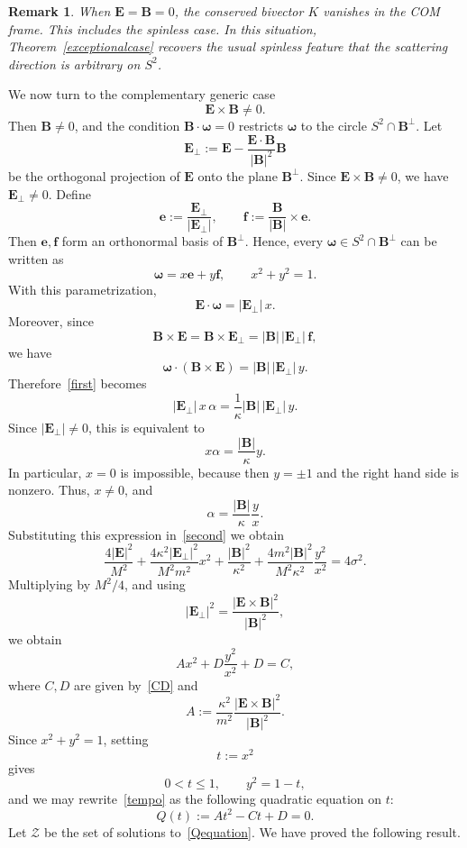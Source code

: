 \documentclass[10pt,a4paper]{amsart}
\newtheorem{remark}[theorem]{Remark}
\begin{document}
\begin{remark}
When ${\bm E}={\bm B}=0$, the conserved bivector $K$ vanishes in the COM frame. This includes the spinless case. In this situation, Theorem~\ref{exceptionalcase} recovers the usual spinless feature that the scattering direction is arbitrary on $S^2$.
\end{remark}
We now turn to the complementary generic case
\[
{\bm E}\times{\bm B}\neq0.
\]
Then ${\bm B}\neq0$, and the condition ${\bm B}\cdot{\bm \omega}=0$ restricts ${\bm \omega}$ to the circle $
S^2\cap{\bm B}^{\perp}$.
Let
\[
{\bm E}_{\perp}:={\bm E}-\frac{{\bm E}\cdot{\bm B}}{|{\bm B}|^2}{\bm B}
\]
be the orthogonal projection of ${\bm E}$ onto the plane ${\bm B}^{\perp}$. Since ${\bm E}\times{\bm B}\neq0$, we have ${\bm E}_{\perp}\neq0$. Define
\begin{equation}\label{basis}
{\bm e}:=\frac{{\bm E}_{\perp}}{|{\bm E}_{\perp}|},\qquad{\bm f}:=\frac{{\bm B}}{|{\bm B}|}\times{\bm e}.
\end{equation}
Then ${\bm e},{\bm f}$ form an orthonormal basis of ${\bm B}^{\perp}$. Hence, every ${\bm \omega}\in S^2\cap{\bm B}^{\perp}$ can be written as
\[
{\bm \omega}=x{\bm e}+y{\bm f},\qquad x^2+y^2=1.
\]
With this parametrization,
\[
{\bm E}\cdot{\bm \omega}=|{\bm E}_{\perp}|\,x.
\]
Moreover, since
\[
{\bm B}\times{\bm E}={\bm B}\times{\bm E}_{\perp}=|{\bm B}|\,|{\bm E}_{\perp}|\,{\bm f},
\]
we have
\[
{\bm \omega}\cdot({\bm B}\times{\bm E})=|{\bm B}|\,|{\bm E}_{\perp}|\,y.
\]
Therefore~\eqref{first} becomes
\[
|{\bm E}_{\perp}|\,x\,\alpha=\frac1\kappa|{\bm B}|\,|{\bm E}_{\perp}|\,y.
\]
Since $|{\bm E}_{\perp}|\neq0$, this is equivalent to
\[
x\alpha=\frac{|{\bm B}|}{\kappa}y.
\]
In particular, $x=0$ is impossible, because then $y=\pm1$ and the right hand side is nonzero. Thus, $x\neq0$, and
\[
\alpha=\frac{|{\bm B}|}{\kappa}\frac{y}{x}.
\]
Substituting this expression in~\eqref{second} we obtain
\[
\frac{4|{\bm E}|^2}{M^2}+\frac{4\kappa^2 |{\bm E}_{\perp}|^2}{M^2m^2}x^2+\frac{|{\bm B}|^2}{\kappa^2}+
\frac{4m^2|{\bm B}|^2}{M^2\kappa^2}\frac{y^2}{x^2}=4\sigma^2.
\]
Multiplying by \(M^2/4\), and using
\[
|{\bm E}_{\perp}|^2=\frac{|{\bm E}\times{\bm B}|^2}{|{\bm B}|^2},
\]
we obtain
\begin{equation}\label{tempo}
A x^2+D\frac{y^2}{x^2}+D=C,
\end{equation}
where $C,D$ are given by~\eqref{CD} and
\begin{equation}\label{A}
A:=\frac{\kappa^2}{m^2}\frac{|{\bm E}\times{\bm B}|^2}{|{\bm B}|^2}.
\end{equation}
Since $x^2+y^2=1$, setting
\[
t:=x^2
\]
gives
\[
0<t\leq1,\qquad y^2=1-t,
\]
and we may rewrite~\eqref{tempo} as the following quadratic equation on $t$:
\begin{equation}\label{Qequation}
Q(t):=A t^2-Ct+D=0.
\end{equation}
Let $\mathcal{Z}$ be the set of solutions to~\eqref{Qequation}.
We have proved the following result.
\end{document}
